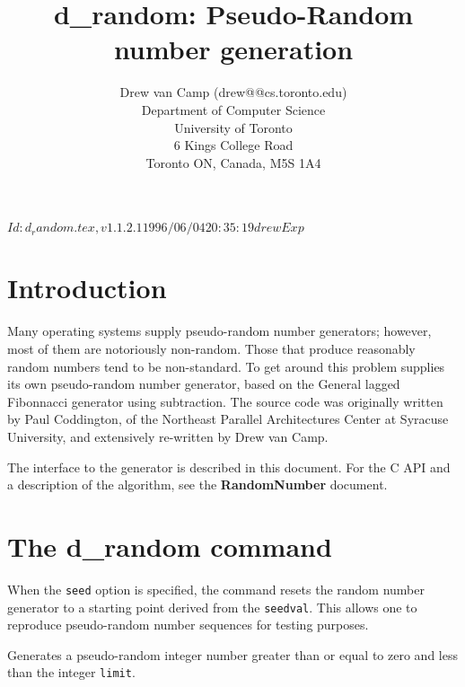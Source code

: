 \documentclass{article}
\newcommand{\drandom}{\textbf{d\_random}}
\begin{document}
\rcsInfo $Id: d_random.tex,v 1.1.2.1 1996/06/04 20:35:19 drew Exp $

\title{d\_random: Pseudo-Random number generation}
\author{Drew van Camp (drew@@cs.toronto.edu)\\[1ex]
	Department of Computer Science\\
	University of Toronto\\
	6 Kings College Road\\
	Toronto ON, Canada, M5S 1A4}

\vfil
\maketitle
\vfil
{}
\vfil
\clearpage

\section{Introduction}

Many operating systems supply pseudo-random number generators;
however, most of them are notoriously non-random.  Those that produce
reasonably random numbers tend to be non-standard.  To get around this
problem \delve{} supplies its own pseudo-random number generator,
based on the General lagged Fibonnacci generator using subtraction.
The source code was originally written by Paul Coddington, of the
Northeast Parallel Architectures Center at Syracuse University, and
extensively re-written by Drew van Camp.

The \tcl{} interface to the generator is described in this document.
For the C API and a description of the algorithm, see the
\textbf{RandomNumber} document.

\section{The \drandom{} command}
When the \texttt{seed} option is specified, the command resets the
random number generator to a starting point derived from the
\texttt{seedval}. This allows one to reproduce pseudo-random number sequences
for testing purposes.  

Generates a pseudo-random integer number greater than or equal to zero
and less than the integer \texttt{limit}.
\end{document}
